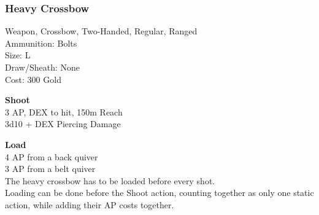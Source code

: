 \subsubsection{Heavy Crossbow}\label{weapon:heavyCrossbow}
Weapon, Crossbow, Two-Handed, Regular, Ranged\\
Ammunition: Bolts\\
Size: L\\
Draw/Sheath: None\\
Cost: 300 Gold

\textbf{Shoot} \\
3 AP, DEX to hit, 150m Reach\\
3d10 + \texttimes DEX Piercing Damage

\textbf{Load} \\
4 AP from a back quiver\\
3 AP from a belt quiver\\
The heavy crossbow has to be loaded before every shot.\\
Loading can be done before the Shoot action, counting together as only one static action, while adding their AP costs together.

